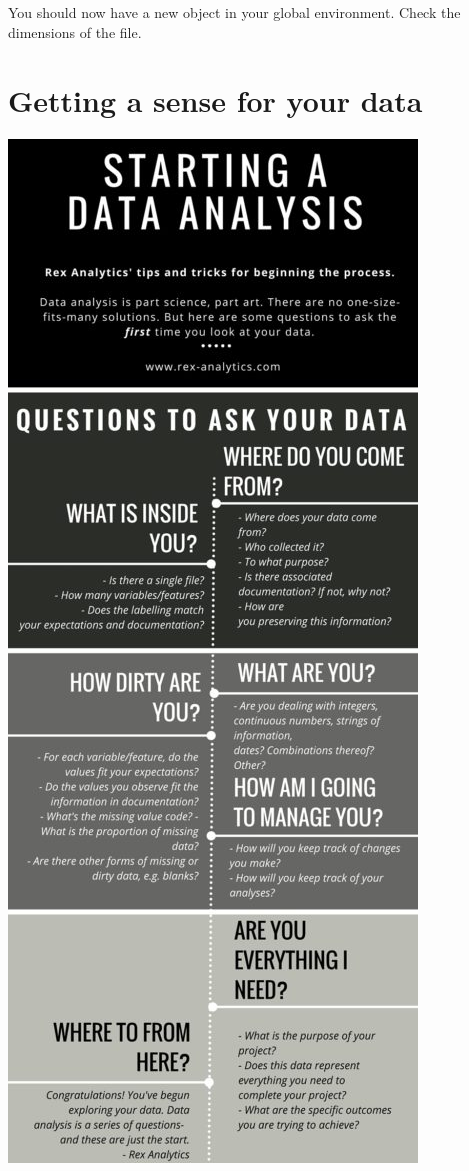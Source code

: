 \documentclass[]{book}
\theoremstyle{definition}
\theoremstyle{definition}
\theoremstyle{definition}
\theoremstyle{remark}
\begin{document}
You should now have a new object in your global environment. Check the
dimensions of the file.

\hypertarget{getting-a-sense-for-your-data}{%
\section{Getting a sense for your
data}\label{getting-a-sense-for-your-data}}

\includegraphics{imgs/firstlookatdata.jpg}
\end{document}
